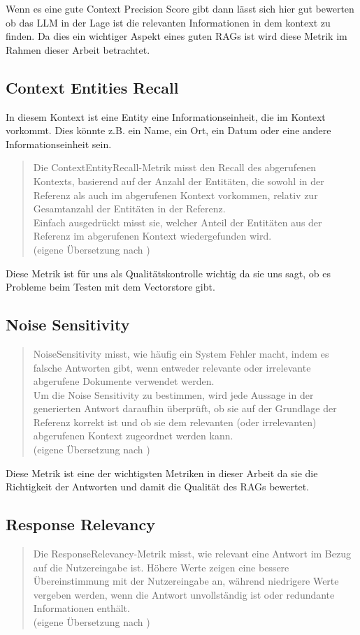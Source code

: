 Wenn es eine gute Context Precision Score gibt dann lässt sich hier gut bewerten ob das LLM in der Lage ist die relevanten Informationen in dem kontext zu finden.
Da dies ein wichtiger Aspekt eines guten RAGs ist wird diese Metrik im Rahmen dieser Arbeit betrachtet.

\subsection{Context Entities Recall}
In diesem Kontext ist eine Entity eine Informationseinheit, die im Kontext vorkommt.
Dies könnte z.B. ein Name, ein Ort, ein Datum oder eine andere Informationseinheit sein.

\begin{quote}
Die ContextEntityRecall-Metrik misst den Recall des abgerufenen Kontexts, basierend auf der Anzahl der Entitäten, die sowohl in der Referenz als auch im abgerufenen Kontext vorkommen, relativ zur Gesamtanzahl der Entitäten in der Referenz.\\
Einfach ausgedrückt misst sie, welcher Anteil der Entitäten aus der Referenz im abgerufenen Kontext wiedergefunden wird.\\
(eigene Übersetzung nach \cite{ragas_context_entities_recall})
\end{quote}
Diese Metrik ist für uns als Qualitätskontrolle wichtig da sie uns sagt, ob es Probleme beim Testen mit dem Vectorstore gibt.

\subsection{Noise Sensitivity}
\begin{quote}
NoiseSensitivity misst, wie häufig ein System Fehler macht, indem es falsche Antworten gibt, wenn entweder relevante oder irrelevante abgerufene Dokumente verwendet werden.\\
Um die Noise Sensitivity zu bestimmen, wird jede Aussage in der generierten Antwort daraufhin überprüft, ob sie auf der Grundlage der Referenz korrekt ist und ob sie dem relevanten (oder irrelevanten) abgerufenen Kontext zugeordnet werden kann.\\
(eigene Übersetzung nach \cite{ragas_noise_sensitivity})
\end{quote}
Diese Metrik ist eine der wichtigsten Metriken in dieser Arbeit da sie die Richtigkeit der Antworten und damit die Qualität des RAGs bewertet.

\subsection{Response Relevancy}
\begin{quote}
Die ResponseRelevancy-Metrik misst, wie relevant eine Antwort im Bezug auf die Nutzereingabe ist. Höhere Werte zeigen eine bessere Übereinstimmung mit der Nutzereingabe an, während niedrigere Werte vergeben werden, wenn die Antwort unvollständig ist oder redundante Informationen enthält.\\
(eigene Übersetzung nach \cite{ragas_response_relevancy})
\end{quote}

